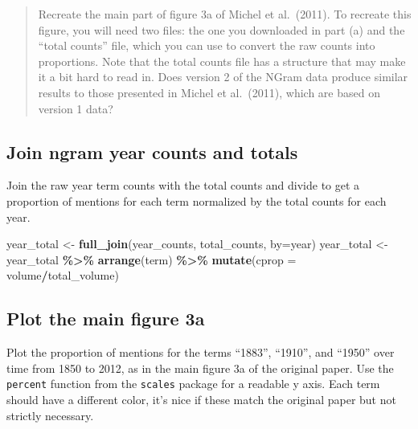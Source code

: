 \documentclass[
]{article}
\newenvironment{Shaded}{\begin{snugshade}}{\end{snugshade}}
\newcommand{\AttributeTok}[1]{\textcolor[rgb]{0.13,0.29,0.53}{#1}}
\newcommand{\FunctionTok}[1]{\textcolor[rgb]{0.13,0.29,0.53}{\textbf{#1}}}
\newcommand{\NormalTok}[1]{#1}
\newcommand{\OtherTok}[1]{\textcolor[rgb]{0.56,0.35,0.01}{#1}}
\newcommand{\SpecialCharTok}[1]{\textcolor[rgb]{0.81,0.36,0.00}{\textbf{#1}}}
\newcommand{\StringTok}[1]{\textcolor[rgb]{0.31,0.60,0.02}{#1}}
\begin{document}
\begin{quote}
Recreate the main part of figure 3a of Michel et al.~(2011). To recreate
this figure, you will need two files: the one you downloaded in part (a)
and the ``total counts'' file, which you can use to convert the raw
counts into proportions. Note that the total counts file has a structure
that may make it a bit hard to read in. Does version 2 of the NGram data
produce similar results to those presented in Michel et al.~(2011),
which are based on version 1 data?
\end{quote}

\hypertarget{join-ngram-year-counts-and-totals}{%
\subsection{Join ngram year counts and
totals}\label{join-ngram-year-counts-and-totals}}

Join the raw year term counts with the total counts and divide to get a
proportion of mentions for each term normalized by the total counts for
each year.

\begin{Shaded}
\begin{Highlighting}[]
\NormalTok{year\_total }\OtherTok{\textless{}{-}} \FunctionTok{full\_join}\NormalTok{(year\_counts, total\_counts, }\AttributeTok{by=}\StringTok{\textquotesingle{}year\textquotesingle{}}\NormalTok{)}
\NormalTok{year\_total }\OtherTok{\textless{}{-}}\NormalTok{ year\_total }\SpecialCharTok{\%\textgreater{}\%} 
  \FunctionTok{arrange}\NormalTok{(term) }\SpecialCharTok{\%\textgreater{}\%} 
  \FunctionTok{mutate}\NormalTok{(}\AttributeTok{cprop =}\NormalTok{ volume}\SpecialCharTok{/}\NormalTok{total\_volume) }
\end{Highlighting}
\end{Shaded}

\hypertarget{plot-the-main-figure-3a}{%
\subsection{Plot the main figure 3a}\label{plot-the-main-figure-3a}}

Plot the proportion of mentions for the terms ``1883'', ``1910'', and
``1950'' over time from 1850 to 2012, as in the main figure 3a of the
original paper. Use the \texttt{percent} function from the
\texttt{scales} package for a readable y axis. Each term should have a
different color, it's nice if these match the original paper but not
strictly necessary.
\end{document}
